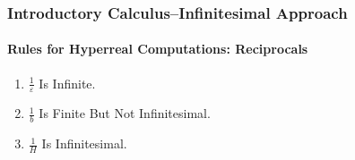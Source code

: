 \begin{frame}
\frametitle{Introductory Calculus--Infinitesimal Approach}
\framesubtitle{Rules for Hyperreal Computations: Reciprocals}
\label{slide:1.5-17}
\begin{hyperrule}[Reciprocals]
\begin{enumerate}
\item $\frac{1}{\varepsilon}$ Is Infinite.
\item $\frac{1}{b}$ Is Finite But Not Infinitesimal.
\item $\frac{1}{H}$ Is Infinitesimal.
\end{enumerate}
\end{hyperrule}
\end{frame}
